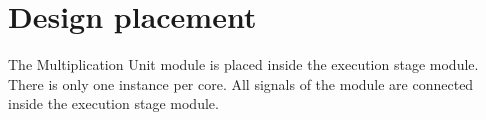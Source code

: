 \section{Design placement}
\label{chapter2}

The Multiplication Unit module is placed inside the execution stage module.
There is only one instance per core.
All signals of the module are connected inside the execution stage module. 
